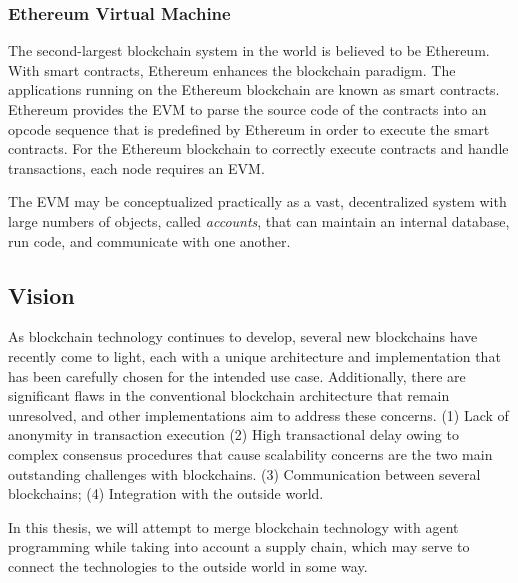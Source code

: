 \subsubsection{Ethereum Virtual Machine}

The second-largest blockchain system in the world is believed to be Ethereum. With smart contracts, Ethereum enhances the blockchain paradigm. The applications running on the Ethereum blockchain are known as smart contracts. Ethereum provides the \ac{EVM} to parse the source code of the contracts into an opcode sequence that is predefined by Ethereum in order to execute the smart contracts. For the Ethereum blockchain to correctly execute contracts and handle transactions, each node requires an \ac{EVM}.

\vspace{.5cm}

The \ac{EVM} may be conceptualized practically as a vast, decentralized system with large numbers of objects, called \textit{accounts}, that can maintain an internal database, run code, and communicate with one another.


\subsection{Vision}
As blockchain technology continues to develop, several new blockchains have recently come to light, each with a unique architecture and implementation that has been carefully chosen for the intended use case. Additionally, there are significant flaws in the conventional blockchain architecture that remain unresolved, and other implementations aim to address these concerns. (1) Lack of anonymity in transaction execution (2) High transactional delay owing to complex consensus procedures that cause scalability concerns are the two main outstanding challenges with blockchains. (3) Communication between several blockchains; (4) Integration with the outside world.

In this thesis, we will attempt to merge blockchain technology with agent programming while taking into account a supply chain, which may serve to connect the technologies to the outside world in some way.
